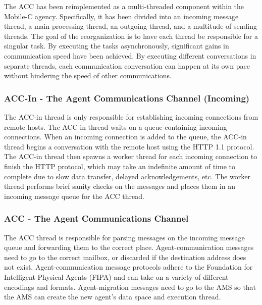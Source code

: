       The ACC has been reimplemented as a multi-threaded component within the
        Mobile-C agency. 
      Specifically, it has been divided into an incoming message thread,
        a main processing thread, an outgoing thread, and a multitude of
        sending threads.
      The goal of the reorganization is to have each thread be responsible
        for a singular task.
      By executing the tasks asynchronously, significant gains in communication
        speed have been achieved. 
      By executing different conversations in separate threads, each communication
        conversation can happen at its own pace without hindering the speed of 
        other communications.

      \subsubsection{ACC-In - The Agent Communications Channel (Incoming)}
        The ACC-in thread is only responsible for establishing incoming
          connections from remote hosts. 
        The ACC-in thread waits on a queue containing incoming connections.
        When an incoming connection is added to the queue, the ACC-in thread
          begins a conversation with the remote host using the HTTP 1.1 protocol.
        The ACC-in thread then spawns a worker thread for each incoming connection
          to finish the HTTP protocol, which may take an indefinite amount of time
          to complete due to slow data transfer, delayed acknowledgements, etc.
        The worker thread performs brief sanity checks on the messages and places
          them in an incoming message queue for the ACC thread.

      \subsubsection{ACC - The Agent Communications Channel}
        The ACC thread is responsible for parsing messages
          on the incoming message queue and forwarding them to the correct place.
        Agent-communication messages need to go to the correct mailbox, or discarded
          if the destination address does not exist.
        Agent-communication message protocols adhere to
          the Foundation for Intelligent Physical Agents (FIPA) \cite{fipa} and can
          take on a variety of different encodings and formats.
        Agent-migration messages need to go to the AMS so that the AMS can create
          the new agent's data space and execution thread.

